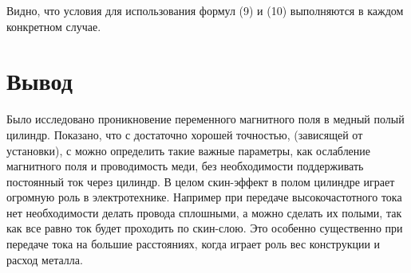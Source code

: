 \documentclass[a4paper, 14pt]{extarticle}%
\begin{document}
Видно, что условия для использования формул (9) и (10) выполняются в каждом конкретном случае.

 \section*{Вывод}
Было исследовано проникновение переменного магнитного поля в медный полый цилиндр. Показано, что с достаточно хорошей точностью, (зависящей от установки), с можно определить такие важные параметры, как ослабление магнитного поля и проводимость меди, без необходимости поддерживать постоянный ток через цилиндр. В целом скин-эффект в полом цилиндре играет огромную роль в электротехнике. Например при передаче высокочастотного тока нет необходимости делать провода сплошными, а можно сделать их полыми, так как все равно ток будет проходить по скин-слою. Это особенно существенно при передаче тока на большие расстояниях, когда играет роль вес конструкции и расход металла. 
\end{document}
